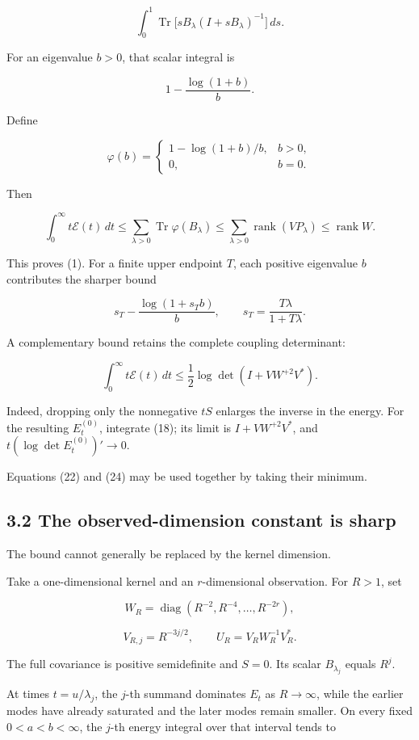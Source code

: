 \documentclass[11pt]{article}
\begin{document}
\[
\int_0^1
\operatorname{Tr}\bigl[sB_\lambda(I+sB_\lambda)^{-1}\bigr]\,ds.
\]

For an eigenvalue \(b>0\), that scalar integral is

\[
1-\frac{\log(1+b)}b.
\]

Define

\[
\varphi(b)=
\begin{cases}
1-\log(1+b)/b,&b>0,\\
0,&b=0.
\end{cases}
\]

Then

\[
\boxed{
\int_0^\infty t\mathcal E(t)\,dt
\le
\sum_{\lambda>0}\operatorname{Tr}\varphi(B_\lambda)
\le
\sum_{\lambda>0}\operatorname{rank}(VP_\lambda)
\le\operatorname{rank}W.
}
\tag{22}
\]

This proves (1). For a finite upper endpoint \(T\), each positive eigenvalue \(b\) contributes the sharper bound

\[
s_T-\frac{\log(1+s_Tb)}b,
\qquad
s_T=\frac{T\lambda}{1+T\lambda}.
\tag{23}
\]

A complementary bound retains the complete coupling determinant:

\[
\boxed{
\int_0^\infty t\mathcal E(t)\,dt
\le
\frac12\log\det(I+VW^{+2}V^*).
}
\tag{24}
\]

Indeed, dropping only the nonnegative \(tS\) enlarges the inverse in the energy. For the resulting \(E_t^{(0)}\), integrate (18); its limit is \(I+VW^{+2}V^*\), and \(t(\log\det E_t^{(0)})'\to0\).

Equations (22) and (24) may be used together by taking their minimum.

\subsection{3.2 The observed-dimension constant is sharp}\label{the-observed-dimension-constant-is-sharp}

The bound cannot generally be replaced by the kernel dimension.

Take a one-dimensional kernel and an \(r\)-dimensional observation. For \(R>1\), set

\[
W_R=\operatorname{diag}(R^{-2},R^{-4},\ldots,R^{-2r}),
\]

\[
V_{R,j}=R^{-3j/2},
\qquad
U_R=V_RW_R^{-1}V_R^*.
\]

The full covariance is positive semidefinite and \(S=0\). Its scalar \(B_{\lambda_j}\) equals \(R^j\).

At times \(t=u/\lambda_j\), the \(j\)-th summand dominates \(E_t\) as \(R\to\infty\), while the earlier modes have already saturated and the later modes remain smaller. On every fixed \(0<a<b<\infty\), the \(j\)-th energy integral over that interval tends to
\end{document}
